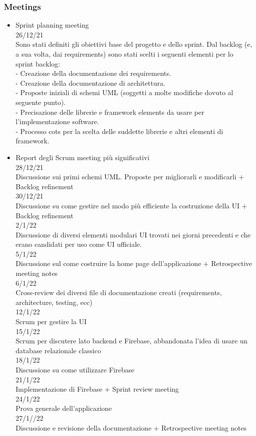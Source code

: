 \documentclass{article}
\begin{document}
\subsubsection{Meetings}
\begin{itemize}
\item Sprint planning meeting 
\\26/12/21 
\\Sono stati definiti gli obiettivi base del progetto e dello sprint. Dal backlog (e, a sua volta, dai requirements) sono stati scelti i seguenti elementi per lo sprint backlog:
\\-	Creazione della documentazione dei requirements.
\\-	Creazione della documentazione di architettura.
\\-	Proposte iniziali di schemi UML (soggetti a molte modifiche dovuto al seguente punto).
\\-	Precisazione delle librerie e framework elements da usare per l’implementazione software.
\\-	Processo cots per la scelta delle suddette librerie e altri elementi di framework.

\item Report degli Scrum meeting più significativi
\\28/12/21 
\\Discussione sui primi schemi UML. Proposte per migliorarli e modificarli + Backlog refinement
\\30/12/21
\\Discussione su come gestire nel modo più efficiente la costruzione della UI + Backlog refinement
\\2/1/22
\\Discussione di diversi elementi modulari UI trovati nei giorni precedenti e che erano candidati per uso come UI ufficiale. 
\\5/1/22
\\Discussione sul come costruire la home page dell’applicazione + Retrospective meeting notes
\\6/1/22
\\Cross-review dei diversi file di documentazione creati (requirements, architecture, testing, ecc) 
\\12/1/22
\\Scrum per gestire la UI
\\15/1/22
\\Scrum per discutere lato backend e Firebase, abbandonata l'idea di usare un database relazionale classico
\\18/1/22
\\Discussione su come utilizzare Firebase
\\21/1/22
\\Implementazione di Firebase + Sprint review meeting 
\\24/1/22
\\Prova generale dell'applicazione
\\27/1//22
\\Discussione e revisione della documentazione + Retrospective meeting notes

\end{itemize}
\newpage
\end{document}

